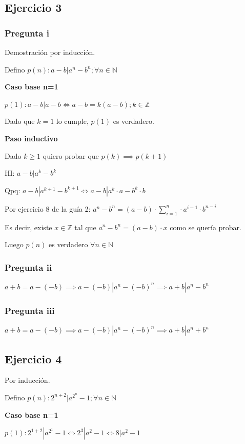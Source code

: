 \subsection{Ejercicio 3}
\subsubsection{Pregunta i}
Demostración por inducción.

Defino $ p(n): a-b | a^n-b^n; \forall n \in \mathbb{N} $

\textbf{Caso base n=1}

$ p(1): a-b | a-b \iff a-b = k(a-b); k \in \mathbb{Z} $

Dado que $ k = 1 $ lo cumple, $ p(1) $ es verdadero.

\textbf{Paso inductivo}

Dado $ k \geq 1 $ quiero probar que $ p(k) \implies p(k+1) $

HI: $ a-b | a^k-b^k $

Qpq: $ a-b | a^{k+1}-b^{k+1} \iff a-b | a^k \cdot a - b^k \cdot b $

Por ejercicio 8 de la guía 2: $ a^n - b^n = (a-b) \cdot \sum_{i=1}^{n}\cdot a^{i-1}\cdot b^{n-i} $

Es decir, existe $ x \in \mathbb{Z} $ tal que $ a^n - b^n = (a-b) \cdot x $ como se quería probar.

Luego $p(n)$ es verdadero $ \forall n \in \mathbb{N} $

\subsubsection{Pregunta ii}
$ a+b = a - (-b) \implies a - (-b) | a^n - (-b)^n \implies a+b | a^n - b^n$

\subsubsection{Pregunta iii}
$ a+b = a-(-b) \implies a-(-b)|a^n - (-b)^n \implies a+b | a^n + b^n $

\subsection{Ejercicio 4}
Por inducción.

Defino $ p(n): 2^{n+2}|a^{2^n}-1; \forall n \in \mathbb{N} $

\textbf{Caso base n=1}

$ p(1): 2^{1+2}|a^{2^1}-1 \iff 2^3 | a^{2}-1 \iff 8 | a^{2}-1 $

